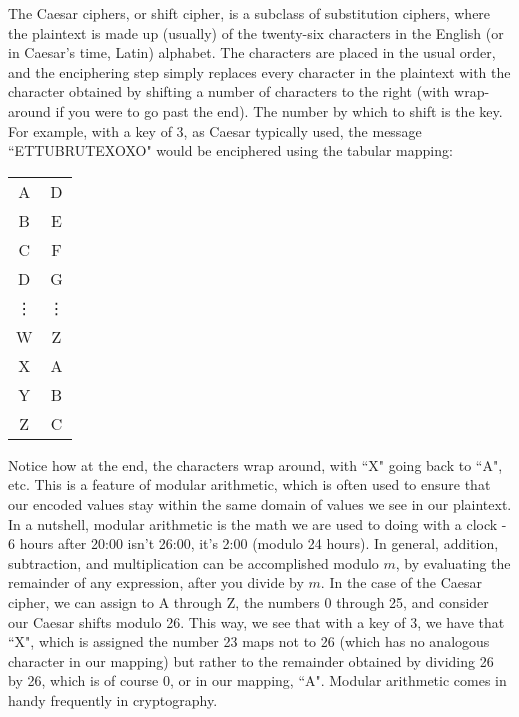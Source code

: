 \documentclass{article}
\begin{document}
The Caesar ciphers, or shift cipher, is a subclass of substitution ciphers, where the plaintext is made up (usually) of the twenty-six characters in the English (or in Caesar's time, Latin) alphabet. The characters are placed in the usual order, and the enciphering step simply replaces every character in the plaintext with the character obtained by shifting a number of characters to the right (with wrap-around if you were to go past the end). The number by which to shift is the key. For example, with a key of 3, as Caesar typically used, the message ``ETTUBRUTEXOXO" would be enciphered using the tabular mapping:
\begin{center}
\begin{tabular}{ c|c } 
 A & D \\ 
 B & E \\ 
 C & F \\ 
 D & G \\ 
 \vdots & \vdots \\ 
 W & Z \\ 
 X & A \\
 Y & B \\ 
 Z & C
\end{tabular}
\end{center}
Notice how at the end, the characters wrap around, with ``X" going back to ``A", etc. This is a feature of modular arithmetic, which is often used to ensure that our encoded values stay within the same domain of values we see in our plaintext. In a nutshell, modular arithmetic is the math we are used to doing with a clock - 6 hours after 20:00 isn't 26:00, it's 2:00 (modulo 24 hours). In general, addition, subtraction, and multiplication can be accomplished modulo $m$, by evaluating the remainder of any expression, after you divide by $m$. In the case of the Caesar cipher, we can assign to A through Z, the numbers 0 through 25, and consider our Caesar shifts modulo 26. This way, we see that with a key of 3, we have that ``X", which is assigned the number 23 maps not to 26 (which has no analogous character in our mapping) but rather to the remainder obtained by dividing 26 by 26, which is of course 0, or in our mapping, ``A". Modular arithmetic comes in handy frequently in cryptography. \medskip
\end{document}
